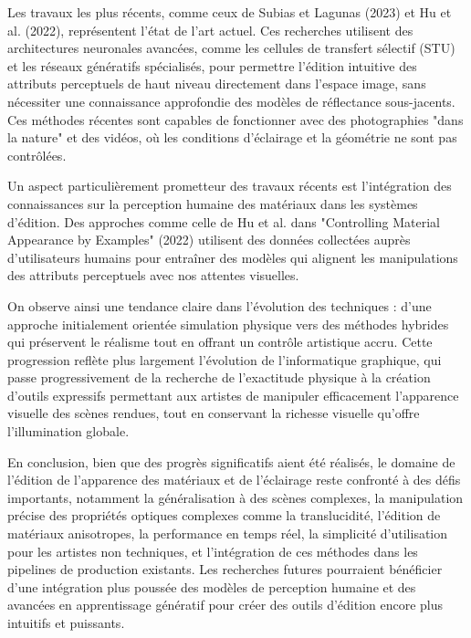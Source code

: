 \documentclass{article}
\begin{document}
Les travaux les plus récents, comme ceux de Subias et Lagunas (2023) et Hu et al. (2022), représentent l'état de l'art actuel. Ces recherches utilisent des architectures neuronales avancées, comme les cellules de transfert sélectif (STU) et les réseaux génératifs spécialisés, pour permettre l'édition intuitive des attributs perceptuels de haut niveau directement dans l'espace image, sans nécessiter une connaissance approfondie des modèles de réflectance sous-jacents. Ces méthodes récentes sont capables de fonctionner avec des photographies "dans la nature" et des vidéos, où les conditions d'éclairage et la géométrie ne sont pas contrôlées.

Un aspect particulièrement prometteur des travaux récents est l'intégration des connaissances sur la perception humaine des matériaux dans les systèmes d'édition. Des approches comme celle de Hu et al. dans "Controlling Material Appearance by Examples" (2022) utilisent des données collectées auprès d'utilisateurs humains pour entraîner des modèles qui alignent les manipulations des attributs perceptuels avec nos attentes visuelles.

On observe ainsi une tendance claire dans l'évolution des techniques : d'une approche initialement orientée simulation physique vers des méthodes hybrides qui préservent le réalisme tout en offrant un contrôle artistique accru. Cette progression reflète plus largement l'évolution de l'informatique graphique, qui passe progressivement de la recherche de l'exactitude physique à la création d'outils expressifs permettant aux artistes de manipuler efficacement l'apparence visuelle des scènes rendues, tout en conservant la richesse visuelle qu'offre l'illumination globale.

En conclusion, bien que des progrès significatifs aient été réalisés, le domaine de l'édition de l'apparence des matériaux et de l'éclairage reste confronté à des défis importants, notamment la généralisation à des scènes complexes, la manipulation précise des propriétés optiques complexes comme la translucidité, l'édition de matériaux anisotropes, la performance en temps réel, la simplicité d'utilisation pour les artistes non techniques, et l'intégration de ces méthodes dans les pipelines de production existants. Les recherches futures pourraient bénéficier d'une intégration plus poussée des modèles de perception humaine et des avancées en apprentissage génératif pour créer des outils d'édition encore plus intuitifs et puissants.
\end{document}
